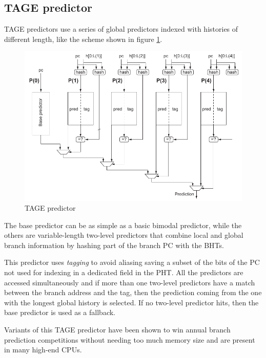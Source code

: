 \subsection{\acl{TAGE} predictor}
\acf{TAGE} predictors \cite{seznec06} use a series of global predictors indexed with histories of different length, like the scheme shown in figure \ref{fig:tage}.
\begin{figure}[hbtp]
  \centering
  \includegraphics[width=\textwidth]{img/tage.pdf}
  \caption{\ac{TAGE} predictor \cite[p.~188]{hennessy17}}
  \label{fig:tage}
\end{figure}
The base predictor can be as simple as a basic bimodal predictor, while the others are variable-length two-level predictors that combine local and global branch information by hashing part of the branch \ac{PC} with the \acp{BHT}.

This predictor uses \emph{tagging} to avoid aliasing saving a subset of the bits of the \ac{PC} not used for indexing in a dedicated field in the \ac{PHT}. All the predictors are accessed simultaneously and if more than one two-level predictors have a match between the branch address and the tag, then the prediction coming from the one with the longest global history is selected. If no two-level predictor hits, then the base predictor is used as a fallback.

Variants of this \ac{TAGE} predictor have been shown to win annual branch prediction competitions without needing too much memory size \cite[p.~189]{hennessy17} and are present in many high-end CPUs.

